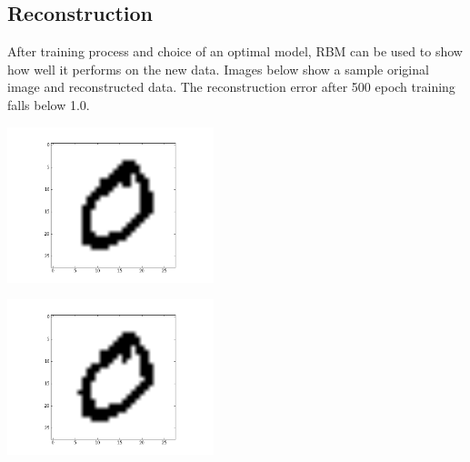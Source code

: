 \documentclass[a4paper]{scrartcl}
\begin{document}
\subsection{Reconstruction}
After training process and choice of an optimal model, RBM can be used to show how well it performs on the new data. Images below show a sample original image and reconstructed data. The reconstruction error after 500 epoch training falls below 1.0.
\begin{minipage}[t]{0.5\textwidth}
\includegraphics[width=6cm]{images/0original.png}
\end{minipage}
\begin{minipage}[t]{0.5\textwidth}
\includegraphics[width=6cm]{images/0_reconstructed_momentum00.png}
\end{minipage}
\end{document}
